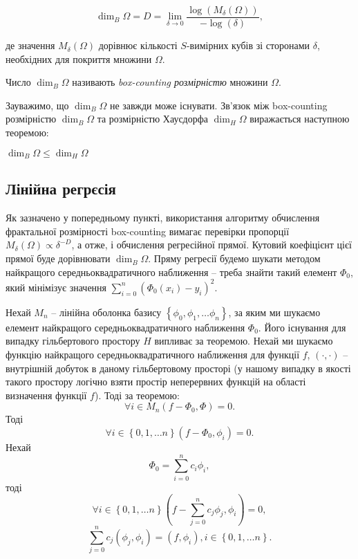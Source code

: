$$\dim_{B}\Omega = D = \lim_{\delta \rightarrow 0} \frac{\log(M_{\delta}(\Omega))}{-\log(\delta)},$$

де значення $M_{\delta}(\Omega)$ дорівнює кількості $S$-вимірних кубів зі сторонами $\delta$, необхідних для покриття множини $\Omega$. 

\begin{defn}
	Число $\dim_{B}\Omega$ називають \emph{box-counting розмірністю} множини $\Omega$.
\end{defn}

Зауважимо, що $\dim_{B}\Omega$ не завжди може існувати. Зв'язок між box-counting розмірністю $\dim_{B}\Omega$ та розмірністю Хаусдорфа $\dim_{H}\Omega$ виражається наступною теоремою:

\begin{thm}
	$\dim_{B}\Omega \leq \dim_{H}\Omega$
\end{thm}


\subsection{Лінійна регрєсія}

Як зазначено у попередньому пункті, використання алгоритму обчислення фрактальної розмірності box-countіng вимагає перевірки пропорції $M_{\delta}(\Omega) \propto \delta^{-D}$, а отже, і обчислення регресійної прямої. Кутовий коефіцієнт цієї прямої буде дорівнювати $\dim_{B}\Omega$. Пряму регресії будемо шукати методом найкращого середньоквадратичного наближення -- треба знайти такий елемент $\Phi_0$, який мінімізує значення  $\sum_{i=0}^{n}{\left( \Phi_0(x_i) - y_i \right)^2}$.

Нехай $M_n$ – лінійна оболонка базису $\left\{ \phi_0, \phi_1, \dots \phi_n\right\}$, за яким ми шукаємо елемент найкращого середньоквадратичного наближення $\Phi_0$. Його існування для випадку гільбертового простору $H$ випливає за теоремою. Нехай ми шукаємо функцію найкращого середньоквадратичного наближення для функції $f$, $\left( \cdot, \cdot \right)$ – внутрішній добуток в даному гільбертовому просторі (у нашому випадку в якості такого простору логічно взяти простір неперервних функцій на області визначення функції $f$). Тоді за теоремою: $$\forall i \in M_n \left( f-\Phi_0, \Phi\right)=0.$$ Тоді $$\forall i \in \left\{ 0, 1, \dots n\right\} \left( f-\Phi_0, \phi_i\right)=0.$$ Нехай $$\Phi_0 = \sum_{i=0}^n {c_i \phi_i},$$ тоді $$\forall i \in \left\{ 0, 1, \dots n\right\} \left( f-\sum_{j=0}^n c_j \phi_j, \phi_i \right) = 0,$$ $$\sum_{j=0}^n {c_j \left(\phi_j, \phi_i \right)} = \left(f, \phi_i \right), i \in \left\{ 0, 1, \dots n \right\}.$$

